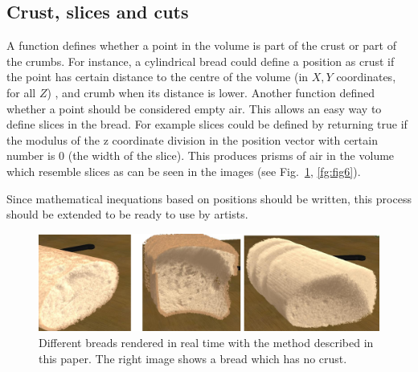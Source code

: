 \documentclass[oneside,a4paper,english,links]{amca}
\begin{document}
\subsection{Crust, slices and cuts}

A function defines whether a point in the volume is part of the crust
or part of the crumbs. For instance, a cylindrical bread could define
a position as crust if the point has certain distance to the centre of
the volume (in $X,Y$ coordinates, for all $Z$) , and crumb when its
distance is lower. Another function defined whether a point should be
considered empty air. This allows an easy way to define slices in the
bread. For example slices could be defined by returning true if the
modulus of the z coordinate division in the position vector with
certain number is $0$ (the width of the slice).  This produces prisms
of air in the volume which resemble slices as can be seen in the
images (see Fig.~\ref{fg:fig5}, \ref{fg:fig6}).

Since mathematical inequations based on positions should be written, this process should be extended to be ready to use by artists.

\begin{figure}[htb!]
  \centerline{\includegraphics[scale=0.3]{fig5}}
  \caption{Different breads rendered in real time with the method described in this paper. The right image shows a bread which has no crust. }
  \label{fg:fig5}
\end{figure}
\end{document}
